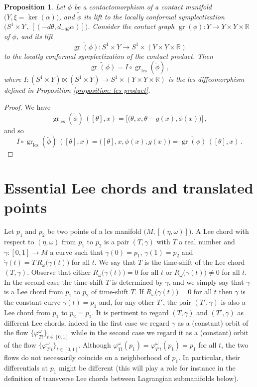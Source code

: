 \documentclass{amsart}
\DeclareMathOperator{\gr}{gr}
\DeclareMathOperator{\lcs}{lcs}
\newtheorem{prop}[thm]{Proposition}
\theoremstyle{remark}
\begin{document}
\begin{prop}\label{proposition: relation graphs lcs contact}
Let $\phi$ be a contactomorphism
of a contact manifold $\big( Y , \xi = \ker (\alpha) \big)$,
and $\widetilde{\phi}$ its lift
to the locally conformal symplectization
$\big( S^1 \times Y \,,\, [(-d\theta, d_{-d\theta} \alpha)] \big)$. 
Consider the contact graph
$\gr (\phi): Y \rightarrow Y \times Y \times \mathbb{R}$
of $\phi$,
and its lift
\[
\widetilde{\gr(\phi)}:
S^1 \times Y \rightarrow S^1 \times (Y \times Y \times \mathbb{R})
\]
to the locally conformal symplectization of the contact product.
Then
\[
\widetilde{\gr(\phi)} = I \circ \gr_{\lcs} (\widetilde{\phi}) \,,
\]
where $I: (S^1 \times Y) \boxtimes (S^1 \times Y)
\rightarrow S^1 \times (Y \times Y \times \mathbb{R})$
is the lcs diffeomorphism
defined in Proposition \ref{proposition: lcs product}.
\end{prop}

\begin{proof}
We have
\[
\gr_{\lcs} (\widetilde{\phi}) \, ([\theta], x)
= \big[ \big( \theta, x, \theta - g(x) , \phi(x)\big) \big] \,,
\]
and so
\[
I \circ \gr_{\lcs} (\widetilde{\phi}) \, ([\theta], x)
= \big( [\theta], x, \phi(x), g(x) \big)
= \widetilde{\gr(\phi)} \, ([\theta], x) \,.
\]
\end{proof}


\section{Essential Lee chords and translated points}\label{section: Lee chords and translated points}

Let $p_1$ and $p_2$ be two points
of a lcs manifold $\big( M, [(\eta, \omega)] \big)$.
A Lee chord with respect to $(\eta, \omega)$
from $p_1$ to $p_2$
is a pair $(T, \gamma)$ with $T$ a real number
and $\gamma: [0, 1] \rightarrow M$
a curve such that $\gamma(0) = p_1$,
$\gamma(1) = p_2$
and $\dot{\gamma} (t) = T \, R_{\omega} \big(\gamma(t)\big)$
for all $t$. 
We say that $T$ is the time-shift
of the Lee chord $(T, \gamma)$.
Observe that either $R_{\omega} \big(\gamma(t)\big) = 0$ for all $t$
or $R_{\omega} \big(\gamma(t)\big) \neq 0$ for all $t$.
In the second case the time-shift $T$
is determined by $\gamma$,
and we simply say that $\gamma$ is a Lee chord
from $p_1$ to $p_2$ of time-shift $T$.
If $R_{\omega} \big(\gamma(t)\big) = 0$ for all $t$
then $\gamma$ is the constant curve
$\gamma(t) = p_1$
and, for any other $T'$, the pair
$(T', \gamma)$ is also a Lee chord from $p_1$ to $p_2 = p_1$.
It is pertinent to regard $(T, \gamma)$ and $(T', \gamma)$
as different Lee chords,
indeed in the first case we regard $\gamma$
as a (constant) orbit of the flow $\{\varphi^{\omega}_{Tt}\}_{t \in [0,1]}$
while in the second case we regard it as a (constant) orbit
of the flow $\{\varphi^{\omega}_{T't}\}_{t \in [0,1]}$.
Although $\varphi^{\omega}_{Tt} (p_1) = \varphi^{\omega}_{T't} (p_1) = p_1$ for all $t$,
the two flows do not necessarily coincide
on a neighborhood of $p_1$.
In particular,
their differentials at $p_1$
might be different
(this will play a role for instance
in the definition of transverse Lee chords
between Lagrangian submanifolds below).
\end{document}
